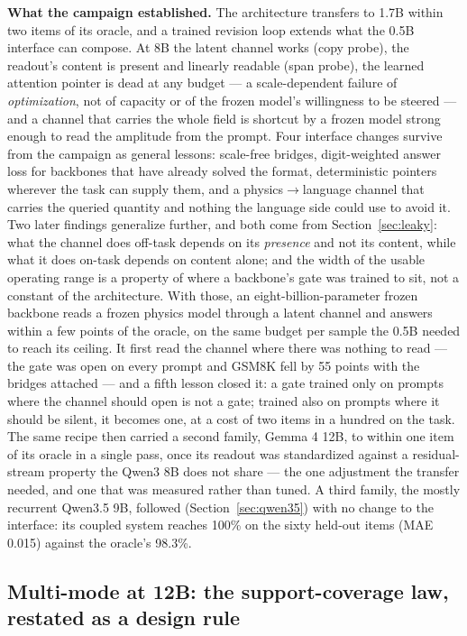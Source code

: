 \documentclass[11pt]{article}
\begin{document}
\textbf{What the campaign established.} The architecture transfers to 1.7B within two items of its oracle, and a trained revision loop extends what the 0.5B interface can compose. At 8B the latent channel works (copy probe), the readout's content is present and linearly readable (span probe), the learned attention pointer is dead at any budget --- a scale-dependent failure of \emph{optimization}, not of capacity or of the frozen model's willingness to be steered --- and a channel that carries the whole field is shortcut by a frozen model strong enough to read the amplitude from the prompt. Four interface changes survive from the campaign as general lessons: scale-free bridges, digit-weighted answer loss for backbones that have already solved the format, deterministic pointers wherever the task can supply them, and a physics$\to$language channel that carries the queried quantity and nothing the language side could use to avoid it. Two later findings generalize further, and both come from Section~\ref{sec:leaky}: what the channel does off-task depends on its \emph{presence} and not its content, while what it does on-task depends on content alone; and the width of the usable operating range is a property of where a backbone's gate was trained to sit, not a constant of the architecture. With those, an eight-billion-parameter frozen backbone reads a frozen physics model through a latent channel and answers within a few points of the oracle, on the same budget per sample the 0.5B needed to reach its ceiling. It first read the channel where there was nothing to read --- the gate was open on every prompt and GSM8K fell by 55 points with the bridges attached --- and a fifth lesson closed it: a gate trained only on prompts where the channel should open is not a gate; trained also on prompts where it should be silent, it becomes one, at a cost of two items in a hundred on the task. The same recipe then carried a second family, Gemma 4 12B, to within one item of its oracle in a single pass, once its readout was standardized against a residual-stream property the Qwen3 8B does not share --- the one adjustment the transfer needed, and one that was measured rather than tuned. A third family, the mostly recurrent Qwen3.5 9B, followed (Section~\ref{sec:qwen35}) with no change to the interface: its coupled system reaches 100\% on the sixty held-out items (MAE 0.015) against the oracle's 98.3\%.

\subsection{Multi-mode at 12B: the support-coverage law, restated as a design rule}
\label{sec:gemma-multimode}
\end{document}
